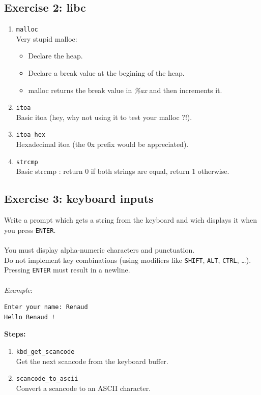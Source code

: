 \subsection*{Exercise 2: libc}


  \begin{enumerate}
  \item {\tt malloc}\\
  Very stupid malloc:
  \begin{itemize}
  \item Declare the heap.
  \item Declare a break value at the begining of the heap.
  \item malloc returns the break value in {\em \%ax} and then increments it.
  \end{itemize}
  \item {\tt itoa}\\
  Basic itoa (hey, why not using it to test your malloc ?!).
  \item {\tt itoa\_hex}\\
  Hexadecimal itoa (the 0x prefix would be appreciated).
  \item {\tt strcmp}\\
  Basic strcmp : return 0 if both strings are equal, return 1 otherwise.
  \end{enumerate}


\subsection*{Exercise 3: keyboard inputs}

Write a prompt which gets a string from the keyboard and wich displays it when you press {\tt ENTER}.\\
\\
You must display alpha-numeric characters and punctuation.\\
Do not implement key combinations (using modifiers like {\tt SHIFT}, {\tt ALT}, {\tt CTRL}, \ldots).\\
Pressing {\tt ENTER} must result in a newline.\\
\\
{\em Example}:
\begin{verbatim}
Enter your name: Renaud
Hello Renaud !
\end{verbatim}
{\bf Steps:}
  \begin{enumerate}
  \item {\tt kbd\_get\_scancode}\\
  Get the next scancode from the keyboard buffer.
  \item {\tt scancode\_to\_ascii}\\
  Convert a scancode to an ASCII character.
  \end{enumerate}



